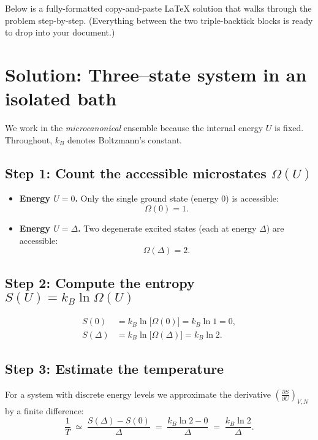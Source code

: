 \documentclass[12pt]{article}
\title{}
\author{Jerich Lee}
\date{\today}
\theoremstyle{definition} %
\theoremstyle{plain} %
\begin{document}
\maketitle
Below is a fully-formatted copy-and-paste LaTeX solution that walks through the problem step-by-step.
(Everything between the two triple-backtick blocks is ready to drop into your document.)

\section*{Solution: Three–state system in an isolated bath}

We work in the \emph{microcanonical} ensemble because the internal energy \(U\) is fixed.  
Throughout, \(k_B\) denotes Boltzmann’s constant.

\subsection*{Step 1:  Count the accessible microstates \(\Omega(U)\)}

\begin{itemize}
  \item \textbf{Energy \(U = 0\).}  
        Only the single ground state (energy \(0\)) is accessible:  
        \[
          \Omega(0)=1 .
        \]
        
  \item \textbf{Energy \(U = \Delta\).}  
        Two degenerate excited states (each at energy \(\Delta\)) are accessible:  
        \[
          \Omega(\Delta)=2 .
        \]
\end{itemize}

\subsection*{Step 2:  Compute the entropy \(S(U)=k_B \ln \Omega(U)\)}

\begin{align}
  S(0)      &= k_B \ln\bigl[\Omega(0)\bigr]      = k_B \ln 1 = 0 ,\\[6pt]
  S(\Delta) &= k_B \ln\bigl[\Omega(\Delta)\bigr] = k_B \ln 2 .
\end{align}

\subsection*{Step 3:  Estimate the temperature}

For a system with discrete energy levels we approximate the derivative  
\(\displaystyle \left(\frac{\partial S}{\partial U}\right)_{V,N}\) by a finite difference:
\[
  \frac{1}{T}
  \;\simeq\;
  \frac{S(\Delta)-S(0)}{\Delta}
  \;=\;
  \frac{k_B\ln 2 - 0}{\Delta}
  \;=\;
  \frac{k_B\ln 2}{\Delta}.
\]
\end{document}
